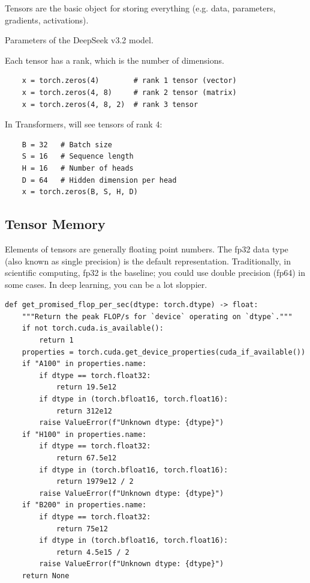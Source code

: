 \documentclass[12pt,twoside]{article}
\begin{document}
Tensors are the basic object for storing everything (e.g. data, parameters, gradients, activations).

\begin{xample}
    Parameters of the DeepSeek v3.2 model.
\end{xample}

Each tensor has a rank, which is the number of dimensions.

\begin{verbatim}
    x = torch.zeros(4)        # rank 1 tensor (vector) 
    x = torch.zeros(4, 8)     # rank 2 tensor (matrix) 
    x = torch.zeros(4, 8, 2)  # rank 3 tensor
\end{verbatim}

In Transformers, will see tensors of rank 4:

\begin{verbatim}
    B = 32   # Batch size
    S = 16   # Sequence length
    H = 16   # Number of heads
    D = 64   # Hidden dimension per head
    x = torch.zeros(B, S, H, D)
\end{verbatim}

\subsection*{Tensor Memory}

Elements of tensors are generally floating point numbers. The fp32 data type (also known as single precision) is the default representation. Traditionally, in scientific computing, fp32 is the baseline; you could use double precision (fp64) in some cases. In deep learning, you can be a lot sloppier. 

\begin{verbatim}
def get_promised_flop_per_sec(dtype: torch.dtype) -> float:
    """Return the peak FLOP/s for `device` operating on `dtype`."""
    if not torch.cuda.is_available():
        return 1
    properties = torch.cuda.get_device_properties(cuda_if_available())  
    if "A100" in properties.name:
        if dtype == torch.float32:
            return 19.5e12
        if dtype in (torch.bfloat16, torch.float16):
            return 312e12
        raise ValueError(f"Unknown dtype: {dtype}")
    if "H100" in properties.name:
        if dtype == torch.float32:
            return 67.5e12
        if dtype in (torch.bfloat16, torch.float16):
            return 1979e12 / 2
        raise ValueError(f"Unknown dtype: {dtype}")
    if "B200" in properties.name:
        if dtype == torch.float32:
            return 75e12
        if dtype in (torch.bfloat16, torch.float16):
            return 4.5e15 / 2
        raise ValueError(f"Unknown dtype: {dtype}")
    return None
\end{verbatim}
\end{document}
